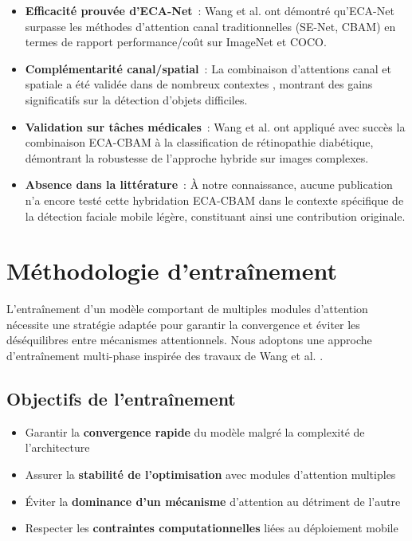 \begin{onehalfspace}
\begin{itemize}
\item \textbf{Efficacité prouvée d'ECA-Net}~: Wang et al. \cite{Wang2020ECANet} ont démontré qu'ECA-Net surpasse les méthodes d'attention canal traditionnelles (SE-Net, CBAM) en termes de rapport performance/coût sur ImageNet et COCO.

\item \textbf{Complémentarité canal/spatial}~: La combinaison d'attentions canal et spatiale a été validée dans de nombreux contextes \cite{Woo2018CBAM, Wang2024ECACBAM}, montrant des gains significatifs sur la détection d'objets difficiles.

\item \textbf{Validation sur tâches médicales}~: Wang et al. \cite{Wang2024ECACBAM} ont appliqué avec succès la combinaison ECA-CBAM à la classification de rétinopathie diabétique, démontrant la robustesse de l'approche hybride sur images complexes.

\item \textbf{Absence dans la littérature}~: À notre connaissance, aucune publication n'a encore testé cette hybridation ECA-CBAM dans le contexte spécifique de la détection faciale mobile légère, constituant ainsi une contribution originale.
\end{itemize}

\section{Méthodologie d'entraînement}

\hspace{0.65 cm}L'entraînement d'un modèle comportant de multiples modules d'attention nécessite une stratégie adaptée pour garantir la convergence et éviter les déséquilibres entre mécanismes attentionnels. Nous adoptons une approche d'entraînement multi-phase inspirée des travaux de Wang et al. \cite{Wang2024ECACBAM}.

\subsection{Objectifs de l'entraînement}

\begin{itemize}
\item Garantir la \textbf{convergence rapide} du modèle malgré la complexité de l'architecture
\item Assurer la \textbf{stabilité de l'optimisation} avec modules d'attention multiples
\item Éviter la \textbf{dominance d'un mécanisme} d'attention au détriment de l'autre
\item Respecter les \textbf{contraintes computationnelles} liées au déploiement mobile
\end{itemize}


\end{onehalfspace}
